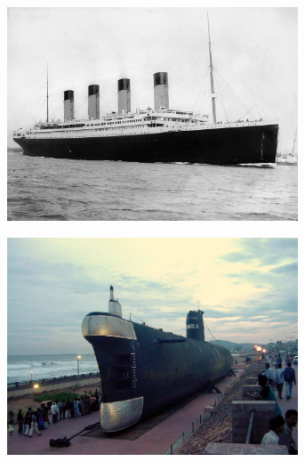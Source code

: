 \begin{figure}[h!]
\begin{subfigure}{0.333\textwidth}
        \caption{}
        \label{fig:anom_container}
    \end{subfigure}
    \begin{subfigure}{0.333\textwidth}
        \centering
        \includegraphics[height=0.15\textheight,width=0.95\textwidth]{images/intro_ood_anomaly/Anomaly_titanic.jpg}
        \caption{}
        \label{fig:anom_titanic}
    \end{subfigure}
    \begin{subfigure}{0.333\textwidth}
        \centering
        \includegraphics[height=0.15\textheight,width=0.95\textwidth]{images/intro_ood_anomaly/ood_submarine.jpg}
        \caption{}
        \label{fig:ood_submarine}
    \end{subfigure}
    \begin{subfigure}{0.333\textwidth}

\end{subfigure}
\end{figure}
